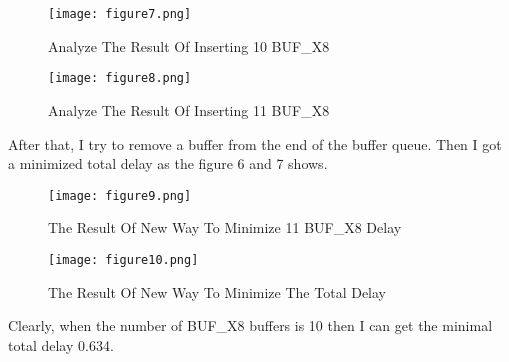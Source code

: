 \documentclass[a4paper,11pt]{article}
\begin{document}
\begin{flushleft}
\newpage
\begin{figure}[ht]
\centering
\texttt{[image: figure7.png]}
\caption{Analyze The Result Of Inserting 10 BUF\_X8}
\label{fig:label}
\end{figure}
\begin{figure}[ht]
\centering
\texttt{[image: figure8.png]}
\caption{Analyze The Result Of Inserting 11 BUF\_X8}
\label{fig:label}
\end{figure}

\newpage
After that, I try to remove a buffer from the end of the buffer queue. Then I got a minimized total delay as the figure 6 and 7 shows.\\
\begin{figure}[ht]
\centering
\texttt{[image: figure9.png]}
\caption{The Result Of New Way To Minimize 11 BUF\_X8 Delay}
\label{fig:label}
\end{figure}
\begin{figure}[ht]
\centering
\texttt{[image: figure10.png]}
\caption{The Result Of New Way To Minimize The Total Delay}
\label{fig:label}
\end{figure}
Clearly, when the number of BUF\_X8 buffers is 10 then I can get the minimal total delay 0.634.

\end{flushleft}
\clearpage
\end{document}
